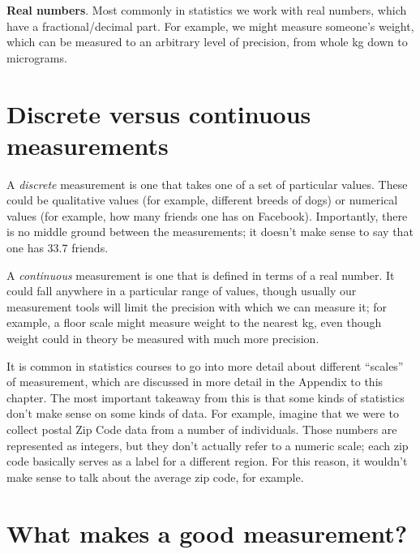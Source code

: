 \documentclass[12pt,]{book}
\theoremstyle{definition}
\theoremstyle{definition}
\theoremstyle{definition}
\theoremstyle{remark}
\begin{document}
\textbf{Real numbers}. Most commonly in statistics we work with real numbers, which have a fractional/decimal part. For example, we might measure someone's weight, which can be measured to an arbitrary level of precision, from whole kg down to micrograms.

\hypertarget{discrete-versus-continuous-measurements}{%
\section{Discrete versus continuous measurements}\label{discrete-versus-continuous-measurements}}

A \emph{discrete} measurement is one that takes one of a set of particular values. These could be qualitative values (for example, different breeds of dogs) or numerical values (for example, how many friends one has on Facebook). Importantly, there is no middle ground between the measurements; it doesn't make sense to say that one has 33.7 friends.

A \emph{continuous} measurement is one that is defined in terms of a real number. It could fall anywhere in a particular range of values, though usually our measurement tools will limit the precision with which we can measure it; for example, a floor scale might measure weight to the nearest kg, even though weight could in theory be measured with much more precision.

It is common in statistics courses to go into more detail about different ``scales'' of measurement, which are discussed in more detail in the Appendix to this chapter. The most important takeaway from this is that some kinds of statistics don't make sense on some kinds of data. For example, imagine that we were to collect postal Zip Code data from a number of individuals. Those numbers are represented as integers, but they don't actually refer to a numeric scale; each zip code basically serves as a label for a different region. For this reason, it wouldn't make sense to talk about the average zip code, for example.

\hypertarget{what-makes-a-good-measurement}{%
\section{What makes a good measurement?}\label{what-makes-a-good-measurement}}
\end{document}
